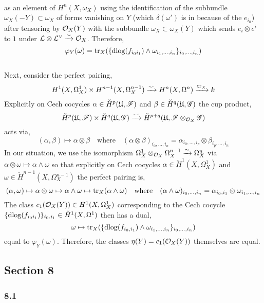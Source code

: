 \documentclass[12pt]{article}
\begin{document}
\begin{enumerate}
\begin{align*}
\end{align*}
as an element of $H^n(X, \omega_X)$ using the identification of the subbundle $\omega_X(-Y) \subset \omega_X$ of forms vanishing on $Y$ (which $\delta(\omega')$ is in because of the $e_{i_0}$) after tensoring by $\mathcal{O}_{X}(Y)$ with the subbundle $\omega_X \subset \omega_X(Y)$ which sends $e_i \otimes e^i$ to $1$ under $\mathcal{L} \otimes \mathcal{L}^\vee \xrightarrow{\sim} \mathcal{O}_{X}$. Therefore,
\[ \varphi_Y(\omega) = \mathrm{tr}_X( \{ \mathrm{d}{\log}(f_{i_0 i_1}) \wedge \omega_{i_1, \dots, i_n} \}_{i_0, \dots, i_n} ) \]
\bigskip\\
Next, consider the perfect pairing,
\[ H^1(X, \Omega_X^1) \times H^{n-1}(X, \Omega_X^{n-1}) \xrightarrow{\smile} H^n(X, \Omega^n) \xrightarrow{\mathrm{tr}_X} k \]
Explicitly on Cech cocycles $\alpha \in \check{H}^p(\mathfrak{U}, \mathscr{F})$ and $\beta \in \check{H}^{q}(\mathfrak{U}, \mathscr{G})$ the cup product,
\[  \check{H}^p(\mathfrak{U}, \mathscr{F}) \times \check{H}^q(\mathfrak{U}, \mathscr{G}) \xrightarrow{\smile} \check{H}^{p+q}(\mathfrak{U}, \mathscr{F} \otimes_{\mathcal{O}_{X}} \mathscr{G}) \] 
acts via,
\[ (\alpha, \beta) \mapsto \alpha \otimes \beta \quad \text{where} \quad (\alpha \otimes \beta)_{i_0, \dots, i_n} = \alpha_{i_0, \dots, i_p} \otimes \beta_{i_p, \dots, i_n} \]
In our situation, we use the isomorphism $\Omega^1_X \otimes_{\mathcal{O}_{X}} \Omega^{n-1}_X \xrightarrow{\sim} \Omega^n_X$ via $\alpha \otimes \omega \mapsto \alpha \wedge \omega$ so that explicitly on Cech cocycles $\alpha \in \check{H}^1(X, \Omega^1_X)$ and $\omega \in \check{H}^{n-1}(X, \Omega^{n-1}_X)$ the perfect pairing is,
\[ (\alpha, \omega) \mapsto \alpha \otimes \omega \mapsto \alpha \wedge \omega \mapsto \mathrm{tr}_X(\alpha \wedge \omega) \quad \text{where} \quad (\alpha \wedge \omega)_{i_0, \dots, i_n} = \alpha_{i_0, i_1} \otimes \omega_{i_1, \dots, i_n} \]
The class $c_1(\mathcal{O}_{X}(Y)) \in H^1(X, \Omega^1_X)$ corresponding to the Cech cocycle $\{ \mathrm{d}{\log}(f_{i_0 i_1}) \}_{i_0,i_1} \in \check{H}^1(X, \Omega^1)$ then has a dual,
\[ \omega \mapsto \mathrm{tr}_X( \{ \mathrm{d}{\log(f_{i_0, i_1})} \wedge \omega_{i_1, \dots, i_n} \}_{i_0, \dots, i_n}) \]
equal to $\varphi_Y(\omega)$. Therefore, the classes $\eta(Y) = c_1(\mathcal{O}_{X}(Y))$ themselves are equal.
\end{enumerate}

\subsection{Section 8}

\subsubsection{8.1}
\end{document}
